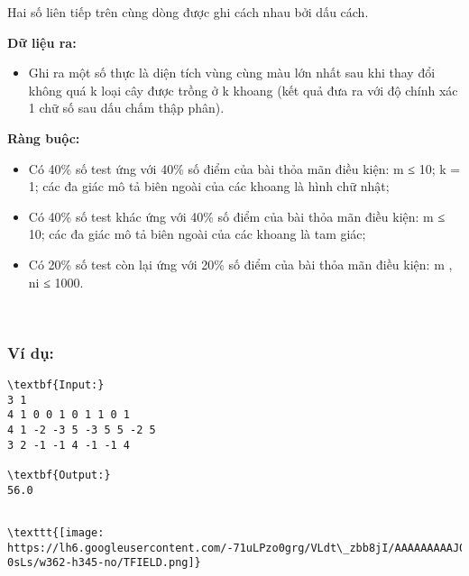 Hai số liên tiếp trên cùng dòng được ghi cách nhau bởi dấu cách.

\textbf{Dữ liệu ra: }
\begin{itemize}
	\item Ghi ra một số thực là diện tích vùng cùng màu lớn nhất sau khi thay đổi không quá k loại cây được trồng ở k khoang (kết quả đưa ra với độ chính xác 1 chữ số sau dấu chấm thập phân).
\end{itemize}

\textbf{Ràng buộc: }
\begin{itemize}
	\item Có 40\% số test ứng với 40\% số điểm của bài thỏa mãn điều kiện: m ≤ 10; k = 1; các đa giác mô tả biên ngoài của các khoang là hình chữ nhật;
	\item Có 40\% số test khác ứng với 40\% số điểm của bài thỏa mãn điều kiện: m ≤ 10; các đa giác mô tả biên ngoài của các khoang là tam giác;
	\item Có 20\% số test còn lại ứng với 20\% số điểm của bài thỏa mãn điều kiện: m , ni ≤ 1000.
\end{itemize}

 

\subsubsection{Ví dụ:}
\begin{verbatim}
\textbf{Input:}
3 1
4 1 0 0 1 0 1 1 0 1
4 1 -2 -3 5 -3 5 5 -2 5
3 2 -1 -1 4 -1 -1 4

\textbf{Output:}
56.0\end{verbatim}
\begin{verbatim}

\texttt{[image: https://lh6.googleusercontent.com/-71uLPzo0grg/VLdt\_zbb8jI/AAAAAAAAAJ0/oLS4N1-0sLs/w362-h345-no/TFIELD.png]}\end{verbatim}
